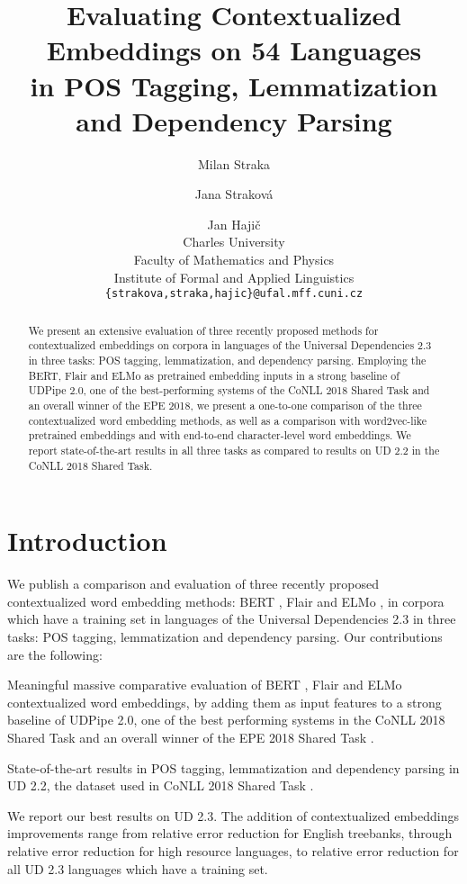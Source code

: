 \documentclass[11pt,a4paper]{article}
\title{Evaluating Contextualized Embeddings on 54 Languages\\
in POS Tagging, Lemmatization and Dependency Parsing}
\author{Milan Straka \and Jana Strakov\'{a} \and Jan Haji\v{c}\\
  Charles University \\
  Faculty of Mathematics and Physics \\
  Institute of Formal and Applied Linguistics \\
  {\tt \{strakova,straka,hajic\}@ufal.mff.cuni.cz} \\}
\date{}
\newenvironment{citemize}{\begin{list}{}{\topsep=.1\smallskipamount\itemsep=0pt\parsep=1pt\labelwidth=.5em}}{\end{list}}
\begin{document}
\maketitle

\begin{abstract}
  We present an extensive evaluation of three recently proposed methods for
  contextualized embeddings on  corpora in  languages of the Universal
  Dependencies 2.3 in three tasks: POS tagging, lemmatization, and dependency
  parsing. Employing the BERT, Flair and ELMo as pretrained embedding inputs in
  a strong baseline of UDPipe 2.0, one of the best-performing systems of the
  CoNLL 2018 Shared Task and an overall winner of the EPE 2018, we present
  a one-to-one comparison of the three contextualized word embedding methods,
  as well as a comparison with word2vec-like pretrained embeddings and with
  end-to-end character-level word embeddings. We report state-of-the-art
  results in all three tasks as compared to results on UD 2.2 in the CoNLL 2018
  Shared Task.
\end{abstract}

\section{Introduction}
\label{section:introduction}

We publish a comparison and evaluation of three recently proposed
contextualized word embedding methods: BERT \cite{BERT}, Flair \cite{Akbik} and
ELMo \cite{Peters2018}, in  corpora which have a training set in 
languages of the Universal Dependencies 2.3 in three tasks: POS tagging,
lemmatization and dependency parsing.
Our contributions are the following:
\begin{citemize}
  \item Meaningful massive comparative evaluation of BERT
    \cite{BERT}, Flair \cite{Akbik} and ELMo \cite{Peters2018} contextualized
    word embeddings, by adding them as input features to a strong baseline of
    UDPipe 2.0, one of the best performing systems in the CoNLL 2018 Shared
    Task \cite{CoNLL2018} and an overall winner of the EPE 2018 Shared Task
    \cite{EPE2018}.
  \item State-of-the-art results in POS tagging, lemmatization and dependency
    parsing in UD 2.2, the dataset used in CoNLL 2018 Shared Task
    \cite{CoNLL2018}.
  \item We report our best results on UD 2.3. The addition of contextualized
    embeddings improvements range from  relative error reduction for
    English treebanks, through  relative error reduction for high
    resource languages, to  relative error reduction for all UD 2.3
    languages which have a training set.
\end{citemize}
\end{document}
